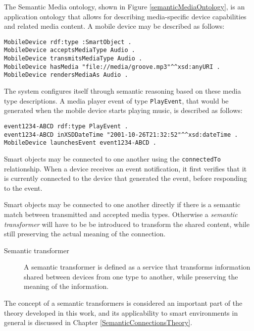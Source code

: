 The Semantic Media ontology, shown in Figure \ref{semanticMediaOntology}, is an application ontology that allows for describing media-specific device capabilities and related media content. A mobile device may be described as follows:


{\footnotesize
\begin{verbatim}
MobileDevice rdf:type :SmartObject .
MobileDevice acceptsMediaType Audio .
MobileDevice transmitsMediaType Audio .
MobileDevice hasMedia "file://media/groove.mp3"^^xsd:anyURI .
MobileDevice rendersMediaAs Audio .
\end{verbatim}
}

The system configures itself through semantic reasoning based on these media type descriptions.  A media player event of type \texttt{PlayEvent}, that would be generated when the mobile device starts playing music, is described as follows:

{\footnotesize
\begin{verbatim}
event1234-ABCD rdf:type PlayEvent .
event1234-ABCD inXSDDateTime "2001-10-26T21:32:52"^^xsd:dateTime .
MobileDevice launchesEvent event1234-ABCD .
\end{verbatim}
}

Smart objects may be connected to one another using the \texttt{connectedTo} relationship. When a device receives an event notification, it first verifies that it is currently connected to the device that generated the event, before responding to the event.

Smart objects may be connected to one another directly if there is a semantic match between transmitted and accepted media types. Otherwise a \emph{semantic transformer} will have to be be introduced to transform the shared content, while still preserving the actual meaning of the connection. 

\begin{description}
	\item [Semantic transformer] A semantic transformer is defined as a service that transforms information shared between devices from one type to another, while preserving the meaning of the information.
\end{description}

The concept of a semantic transformers is considered an important part of the theory developed in this work, and its applicability to smart environments in general is discussed in Chapter \ref{SemanticConnectionsTheory}.



